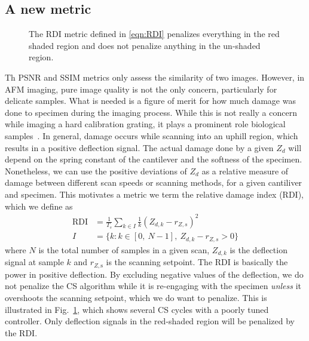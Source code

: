 \documentclass[twocolumn,oneside]{IEEEtran/IEEEtran}
\begin{document}

\subsection{A new metric}
\begin{figure}[t!]
  \centering
  
  \caption{The RDI metric defined in \eqref{eqn:RDI} penalizes everything in the
    red shaded region and does not penalize anything in the un-shaded region.}
  \label{fig:damage_illustrate}
\end{figure}

Th PSNR and SSIM metrics only assess the similarity of two images.
However, in AFM imaging, pure image quality is not the
only concern, particularly for delicate samples. What is needed is a figure of
merit for how much damage was done to specimen during the imaging process. While
this is not really a concern while imaging a hard calibration grating, it plays
a prominent role biological samples~\cite{ando_highspeed_2008}. In general,
damage occurs while scanning into an uphill region, which results in a positive
deflection signal. The actual damage done by a given $Z_d$ will depend on the
spring constant of the cantilever and the softness of the specimen. Nonetheless,
we can use the positive deviations of $Z_d$ as a relative measure of damage
between different scan speeds or scanning methods, for a given cantiliver and
specimen. This motivates a metric we term the relative damage index (RDI), which
we define as
\begin{align}
  \text{RDI} &= \frac{1}{T_s}\sum_{k\in I} \frac{1}{k} \left(Z_{d,k} - r_{Z,s}\right)^2 \label{eqn:RDI}\\
  I &= \{k: k\in[0,~N-1],~ Z_{d,k}-r_{Z,s} > 0 \} \nonumber
\end{align}
where $N$ is the total number of samples in a given scan, $Z_{d,k}$ is the
deflection signal at sample $k$ and $r_{Z,\textrm{s}}$ is the scanning setpoint.
The RDI is basically the power in positive deflection. By excluding negative
values of the deflection, we do not penalize the CS algorithm while it is
re-engaging with the specimen \emph{unless} it overshoots the scanning setpoint,
which we do want to penalize. This is illustrated in
Fig.~\ref{fig:damage_illustrate}, which shows several CS cycles with a poorly
tuned controller. Only deflection signals in the red-shaded region will be
penalized by the RDI.
\end{document}
